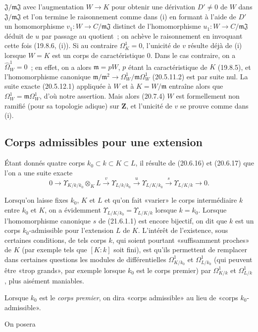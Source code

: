 \begin{remarks}[21.5.3]
\begin{enumerate}
  $\mathfrak J/\mathfrak m\mathfrak J$ avec l'augmentation $W\to K$ pour
  obtenir une dérivation $D'\ne0$ de $W$ dans
  $\mathfrak J/\mathfrak m\mathfrak J$ et l'on termine le raisonnement comme
  dans (i) en formant à l'aide de $D'$ un homomorphisme
  $v_1:W\to C/\mathfrak m\mathfrak J$ distinct de l'homomorphisme
  $u_1:W\to C/\mathfrak m\mathfrak J$ déduit de $u$ par passage au quotient~;
  on achève le raisonnement en invoquant cette fois (19.8.6, (i)). Si au
  contraire $\Omega^1_K=0$, l'unicité de $v$ résulte déjà de (i) lorsque
  $W=K$ est un corps de caractéristique $0$. Dans le cas contraire, on a
  $\widehat{\Omega}^1_W=0$~; en effet, on a alors $\mathfrak m=pW$, $p$ étant
  la caractéristique de $K$ (19.8.5), et l'homomorphisme canonique
  $\mathfrak m/\mathfrak m^2\to\Omega^1_W/\mathfrak m\Omega^1_W$ (20.5.11.2)
  est par suite nul. La suite exacte (20.5.12.1) appliquée à $W$ et à
  $K=W/\mathfrak m$ entraîne alors que $\Omega^1_W=\mathfrak m\Omega^1_W$,
  d'où notre assertion. Mais alors (20.7.4) $W$ est formellement non ramifié
  (pour sa topologie adique) sur $\mathbf Z$, et l'unicité de $v$ se prouve
  comme dans (i).
\end{enumerate}
\end{remarks}

\subsection{Corps admissibles pour une extension}
\label{section:0.21.6-fr}

\begin{env}[21.6.1]
\label{0.21.6.1-fr}
Étant donnés quatre corps $k_0\subset k\subset K\subset L$, il résulte de
(20.6.16) et (20.6.17) que l'on a une suite exacte
\begin{equation}
\tag{21.6.1.1}
\label{0.21.6.1.1-fr}
0\to\Upsilon_{K/k/k_0}\otimes_KL\xrightarrow{v}\Upsilon_{L/k/k_0}
\xrightarrow{u}\Upsilon_{L/K/k_0}\xrightarrow{s}\Upsilon_{L/K/k}\to0.
\end{equation}

Lorsqu'on laisse fixes $k_0$, $K$ et $L$ et qu'on fait «varier» le corps
intermédiaire $k$ entre $k_0$ et $K$, on a évidemment
$\Upsilon_{L/K/k_0}=\Upsilon_{L/K/k}$ lorsque $k=k_0$. Lorsque
l'homomorphisme canonique $s$ de (21.6.1.1) est encore bijectif, on dit que
$k$ est un corps $k_0$-admissible pour l'extension $L$ de $K$. L'intérêt de
l'existence, sous certaines conditions, de tels corps $k$, qui soient pourtant
«suffisamment proches» de $K$ (par exemple tels que $[K:k]$ soit fini), est
qu'ils permettent de remplacer dans certaines questions les modules de
différentielles $\Omega^1_{K/k_0}$ et $\Omega^1_{L/k_0}$ (qui peuvent être
«trop grands», par exemple lorsque $k_0$ est le corps premier) par
$\Omega^1_{K/k}$ et $\Omega^1_{L/k}$, plus aisément maniables.

Lorsque $k_0$ est le \emph{corps premier}, on dira «corps admissible» au lieu
de «corps $k_0$-admissible».
 
On posera
\end{env}

